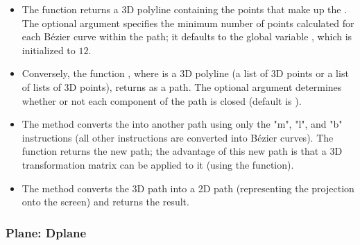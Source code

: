 \begin{itemize}
\item The function  returns a 3D polyline containing the points that make up the . The optional argument  specifies the minimum number of points calculated for each Bézier curve within the path; it defaults to the global variable , which is initialized to $12$. 

\item Conversely, the function , where  is a 3D polyline (a list of 3D points or a list of lists of 3D points), returns  as a path. The optional argument  determines whether or not each component of the path is closed (default is \false). 

\item The method  converts the  into another path using only the "m", "l", and "b" instructions (all other instructions are converted into Bézier curves). The function returns the new path; the advantage of this new path is that a 3D transformation matrix can be applied to it (using the  function). 

\item The method  converts the 3D path  into a 2D path (representing the projection onto the screen) and returns the result.
\end{itemize}


\subsubsection{Plane: Dplane}

